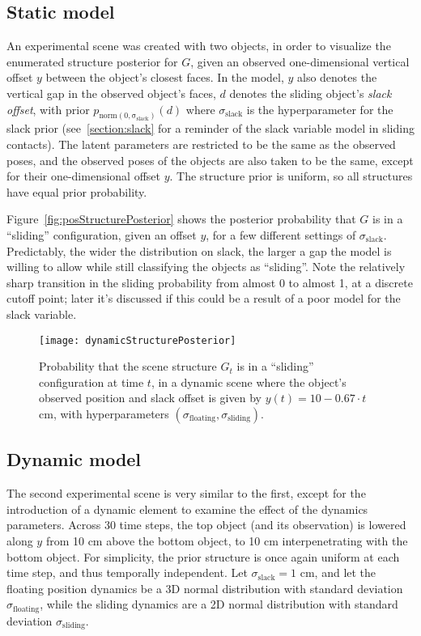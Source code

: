 \subsection{Static model}
An experimental scene was created with two objects, in order to visualize the enumerated structure posterior for $G$, given an observed one-dimensional vertical offset $y$ between the object's closest faces.
In the model, $y$ also denotes the vertical gap in the observed object's faces, $d$ denotes the sliding object's \textit{slack offset}, with prior $p_\mathrm{norm(0, \sigma_\mathrm{slack})}(d)$ where $\sigma_\mathrm{slack}$ is the hyperparameter for the slack prior (see~\ref{section:slack} for a reminder of the slack variable model in sliding contacts).
The latent parameters are restricted to be the same as the observed poses, and the observed poses of the objects are also taken to be the same, except for their one-dimensional offset $y$.
The structure prior is uniform, so all structures have equal prior probability.

Figure~\ref{fig:posStructurePosterior} shows the posterior probability that $G$ is in a ``sliding'' configuration, given an offset $y$, for a few different settings of $\sigma_\mathrm{slack}$.
Predictably, the wider the distribution on slack, the larger a gap the model is willing to allow while still classifying the objects as ``sliding''.
Note the relatively sharp transition in the sliding probability from almost 0 to almost 1, at a discrete cutoff point; later it's discussed if this could be a result of a poor model for the slack variable.

\raggedbottom
\pagebreak
\flushbottom

\begin{figure}[H]
  \texttt{[image: dynamicStructurePosterior]}
  \caption{
    Probability that the scene structure $G_t$ is in a ``sliding'' configuration at time $t$, in a dynamic scene where the object's observed position and slack offset is given by $y(t) = 10 - 0.67\cdot t$ cm, with hyperparameters $(\sigma_\mathrm{floating}, \sigma_\mathrm{sliding})$.
  }
  \label{fig:dynamicStructurePosterior}
\end{figure}

\subsection{Dynamic model}
The second experimental scene is very similar to the first, except for the introduction of a dynamic element to examine the effect of the dynamics parameters.
Across 30 time steps, the top object (and its observation) is lowered along $y$ from 10 cm above the bottom object, to 10 cm interpenetrating with the bottom object.
For simplicity, the prior structure is once again uniform at each time step, and thus temporally independent.
Let $\sigma_\mathrm{slack} = 1$ cm, and let the floating position dynamics be a 3D normal distribution with standard deviation $\sigma_\mathrm{floating}$, while the sliding dynamics are a 2D normal distribution with standard deviation $\sigma_\mathrm{sliding}$.

